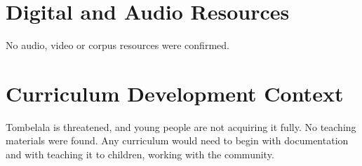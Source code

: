 \documentclass[12pt]{article}
\begin{document}
\section{Digital and Audio Resources}
No audio, video or corpus resources were confirmed.

\section{Curriculum Development Context}
Tombelala is threatened, and young people are not acquiring it fully. No teaching materials were found. Any curriculum would need to begin with documentation and with teaching it to children, working with the community.
\end{document}
